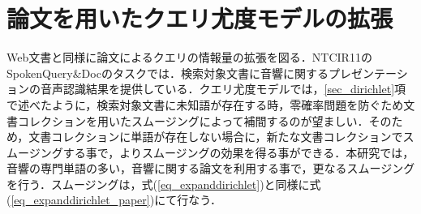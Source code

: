 




\section{論文を用いたクエリ尤度モデルの拡張}
Web文書と同様に論文によるクエリの情報量の拡張を図る．NTCIR11のSpokenQuery\&Docのタスクでは．検索対象文書に音響に関するプレゼンテーションの音声認識結果を提供している．クエリ尤度モデルでは，\ref{sec_dirichlet}項で述べたように，検索対象文書に未知語が存在する時，零確率問題を防ぐため文書コレクションを用いたスムージングによって補間するのが望ましい．そのため，文書コレクションに単語が存在しない場合に，新たな文書コレクションでスムージングする事で，よりスムージングの効果を得る事ができる．本研究では，音響の専門単語の多い，音響に関する論文を利用する事で，更なるスムージングを行う．スムージングは，式(\ref{eq_expanddirichlet})と同様に式(\ref{eq_expanddirichlet_paper})にて行なう．

